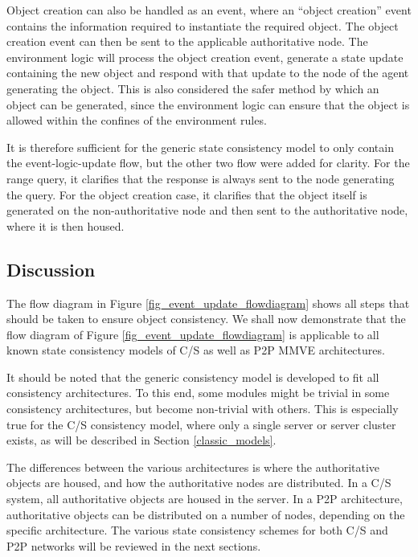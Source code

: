 Object creation can also be handled as an event, where an ``object creation'' event contains the information required to instantiate the required object. The object creation event can then be sent to the applicable authoritative node. The environment logic will process the object creation event, generate a state update containing the new object and respond with that update to the node of the agent generating the object. This is also considered the safer method by which an object can be generated, since the environment logic can ensure that the object is allowed within the confines of the environment rules.

It is therefore sufficient for the generic state consistency model to only contain the event-logic-update flow, but the other two flow were added for clarity. For the range query, it clarifies that the response is always sent to the node generating the query. For the object creation case, it clarifies that the object itself is generated on the non-authoritative node and then sent to the authoritative node, where it is then housed.

\subsection{Discussion}

The flow diagram in Figure \ref{fig_event_update_flowdiagram} shows all steps that should be taken to ensure object consistency. We shall now demonstrate that the flow diagram of Figure \ref{fig_event_update_flowdiagram} is applicable to all known state consistency models of C/S as well as P2P MMVE architectures.

It should be noted that the generic consistency model is developed to fit all consistency architectures. To this end, some modules might be trivial in some consistency architectures, but become non-trivial with others. This is especially true for the C/S consistency model, where only a single server or server cluster exists, as will be described in Section \ref{classic_models}.

The differences between  the various architectures is where the authoritative objects are  housed, and how the authoritative nodes are distributed. In a C/S system, all authoritative objects are housed in the server. In a P2P architecture, authoritative objects can be distributed on a number of nodes, depending on the specific architecture. The various state consistency schemes for both C/S and P2P networks will be reviewed in the next sections.

